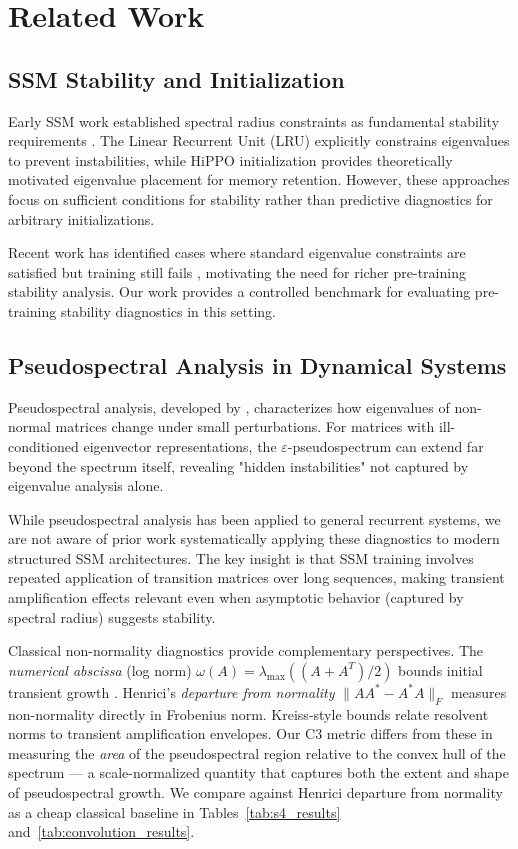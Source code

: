 \documentclass[twoside]{article}
\begin{document}
\section{Related Work}

\subsection{SSM Stability and Initialization}

Early SSM work established spectral radius constraints as fundamental stability requirements \citep{gu2022efficiently}. The Linear Recurrent Unit (LRU) \citep{orvieto2023resurrecting} explicitly constrains eigenvalues to prevent instabilities, while HiPPO initialization \citep{gu2020hippo} provides theoretically motivated eigenvalue placement for memory retention. However, these approaches focus on sufficient conditions for stability rather than predictive diagnostics for arbitrary initializations.

Recent work has identified cases where standard eigenvalue constraints are satisfied but training still fails \citep{orvieto2023resurrecting}, motivating the need for richer pre-training stability analysis. Our work provides a controlled benchmark for evaluating pre-training stability diagnostics in this setting.

\subsection{Pseudospectral Analysis in Dynamical Systems}

Pseudospectral analysis, developed by \citet{trefethen2005spectra}, characterizes how eigenvalues of non-normal matrices change under small perturbations. For matrices with ill-conditioned eigenvector representations, the $\varepsilon$-pseudospectrum can extend far beyond the spectrum itself, revealing "hidden instabilities" not captured by eigenvalue analysis alone.

While pseudospectral analysis has been applied to general recurrent systems, we are not aware of prior work systematically applying these diagnostics to modern structured SSM architectures. The key insight is that SSM training involves repeated application of transition matrices over long sequences, making transient amplification effects relevant even when asymptotic behavior (captured by spectral radius) suggests stability.

Classical non-normality diagnostics provide complementary perspectives. The \textit{numerical abscissa} (log norm) $\omega(A) = \lambda_{\max}((A + A^T)/2)$ bounds initial transient growth \citep{trefethen2005spectra}. Henrici's \textit{departure from normality} $\|AA^* - A^*A\|_F$ \citep{henrici1962bounds} measures non-normality directly in Frobenius norm. Kreiss-style bounds relate resolvent norms to transient amplification envelopes. Our C3 metric differs from these in measuring the \textit{area} of the pseudospectral region relative to the convex hull of the spectrum — a scale-normalized quantity that captures both the extent and shape of pseudospectral growth. We compare against Henrici departure from normality as a cheap classical baseline in Tables~\ref{tab:s4_results} and~\ref{tab:convolution_results}.
\end{document}
